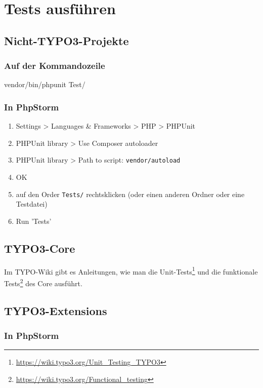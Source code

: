 \documentclass[a4paper,10pt,headsepline]{scrartcl}
\begin{document}
\pagebreak
\section{Tests ausführen}

\subsection{Nicht-TYPO3-Projekte}

\subsubsection{Auf der Kommandozeile}

\begin{bashcode}
vendor/bin/phpunit Test/
\end{bashcode}

\subsubsection{In PhpStorm}
\begin{enumerate}
  \item Settings > Languages \& Frameworks > PHP > PHPUnit
  \item PHPUnit library > Use Composer autoloader
  \item PHPUnit library > Path to script: \texttt{vendor/autoload}
  \item OK
  \item auf den Order \texttt{Tests/} rechtsklicken (oder einen anderen Ordner oder eine Testdatei)
  \item Run 'Tests'
\end{enumerate}


\subsection{TYPO3-Core}

Im TYPO-Wiki gibt es Anleitungen, wie man die Unit-Tests\footnote{\url{https://wiki.typo3.org/Unit_Testing_TYPO3}} und die funktionale Tests\footnote{\url{https://wiki.typo3.org/Functional_testing}} des Core ausführt.


\subsection{TYPO3-Extensions}

\subsubsection{In PhpStorm}
\end{document}

